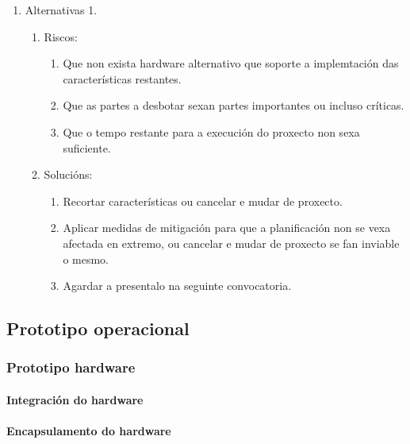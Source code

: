  \begin{enumerate}
  \item Alternativas 1.
        \begin{enumerate}
         \item Riscos:
               \begin{enumerate}
                \item Que non exista hardware alternativo que soporte a
                      implemtación das características restantes.
                \item Que as partes a desbotar sexan partes importantes ou
                      incluso críticas.
                \item Que o tempo restante para a execución do proxecto non
                      sexa suficiente.
               \end{enumerate}
         \item Solucións:
               \begin{enumerate}
                \item Recortar características ou cancelar e mudar de proxecto.
                \item Aplicar medidas de mitigación para que a planificación
                      non se vexa afectada en extremo, ou cancelar e mudar de
                      proxecto se fan inviable o mesmo.
                \item Agardar a presentalo na seguinte convocatoria.
               \end{enumerate}
        \end{enumerate}
 \end{enumerate}

 \subsection{Prototipo operacional}

  \subsubsection{Prototipo hardware}

   \paragraph{Integración do hardware}

   \paragraph{Encapsulamento do hardware}

